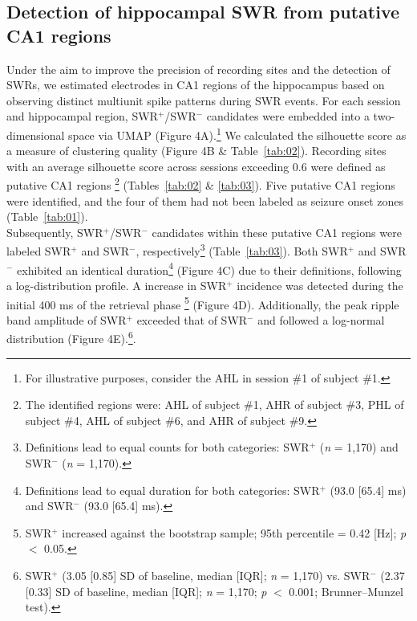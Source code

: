 \subsection{Detection of hippocampal SWR from putative CA1 regions}
Under the aim to improve the precision of recording sites and the detection of SWRs, we estimated electrodes in CA1 regions of the hippocampus based on observing distinct multiunit spike patterns during SWR events. For each session and hippocampal region, SWR$^+$/SWR$^-$ candidates were embedded into a two-dimensional space via UMAP (Figure 4A).\footnote{For illustrative purposes, consider the AHL in session \#1 of subject \#1.} We calculated the silhouette score as a measure of clustering quality (Figure 4B \& Table~\ref{tab:02}). Recording sites with an average silhouette score across sessions exceeding 0.6 were defined as putative CA1 regions \footnote{The identified regions were: AHL of subject \#1, AHR of subject \#3, PHL of subject \#4, AHL of subject \#6, and AHR of subject \#9.}  (Tables~\ref{tab:02} \& \ref{tab:03}). Five putative CA1 regions were identified, and the four of them had not been labeled as seizure onset zones (Table~\ref{tab:01}).
\\
\indent
Subsequently, SWR$^+$/SWR$^-$ candidates within these putative CA1 regions were labeled SWR$^+$ and SWR$^-$, respectively\footnote{Definitions lead to equal counts for both categories: SWR$^+$ (\textit{n} = 1,170) and SWR$^-$ (\textit{n} = 1,170).}  (Table~\ref{tab:03}). Both SWR$^+$ and SWR$^-$ exhibited an identical duration\footnote{Definitions lead to equal duration for both categories: SWR$^+$ (93.0 [65.4] ms) and SWR$^-$ (93.0 [65.4] ms).}  (Figure 4C) due to their definitions, following a log-distribution profile. A increase in SWR$^+$ incidence was detected during the initial 400 ms of the retrieval phase \footnote{SWR$^+$ increased against the bootstrap sample; 95th percentile = 0.42 [Hz]; \textit{p} $<$ 0.05.}  (Figure 4D). Additionally, the peak ripple band amplitude of SWR$^+$ exceeded that of SWR$^-$ and followed a log-normal distribution (Figure 4E).\footnote{SWR$^+$ (3.05 [0.85] SD of baseline, median [IQR]; \textit{n} = 1,170) vs. SWR$^-$ (2.37 [0.33] SD of baseline, median [IQR]; \textit{n} = 1,170; \textit{p} $<$ 0.001; Brunner--Munzel test).}.

